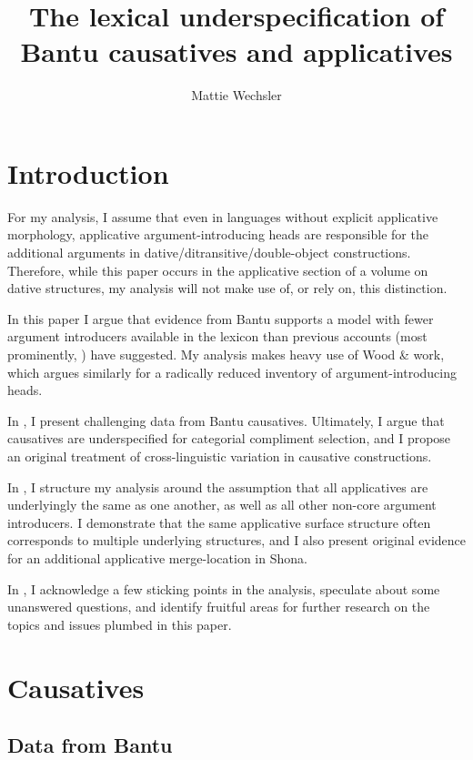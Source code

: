 \documentclass[output=paper]{langscibook}
\author{Mattie Wechsler\affiliation{}}
\title{The lexical underspecification of Bantu causatives and applicatives}
\begin{document}
\maketitle 


\section{Introduction}\label{sec:wechsler:1}

For my analysis, I assume that even in languages without explicit applicative morphology, applicative argument-introducing heads are responsible for the additional arguments in dative/ditransitive/double-object constructions. Therefore, while this paper occurs in the applicative section of a volume on dative structures, my analysis will not make use of, or rely on, this distinction. 

In this paper I argue that evidence from Bantu supports a model with fewer argument introducers available in the lexicon than previous accounts (most prominently, \citealt{Pylkkänen2008}) have suggested. My analysis makes heavy use of Wood \&  work, which argues similarly for a radically reduced inventory of argument-introducing heads. 

In , I present challenging data from Bantu causatives. Ultimately, I argue that causatives are underspecified for categorial compliment selection, and I propose an original treatment of cross-linguistic variation in causative constructions.

In , I structure my analysis around the assumption that all applicatives are underlyingly the same as one another, as well as all other non-core argument introducers. I demonstrate that the same applicative surface structure often corresponds to multiple underlying structures, and I also present original evidence for an additional applicative merge-location in Shona. 

In , I acknowledge a few sticking points in the analysis, speculate about some unanswered questions, and identify fruitful areas for further research on the topics and issues plumbed in this paper. 

\section{Causatives}\label{sec:wechsler:2}

\subsection{Data from Bantu}\label{sec:wechsler:2.1}
\end{document}
